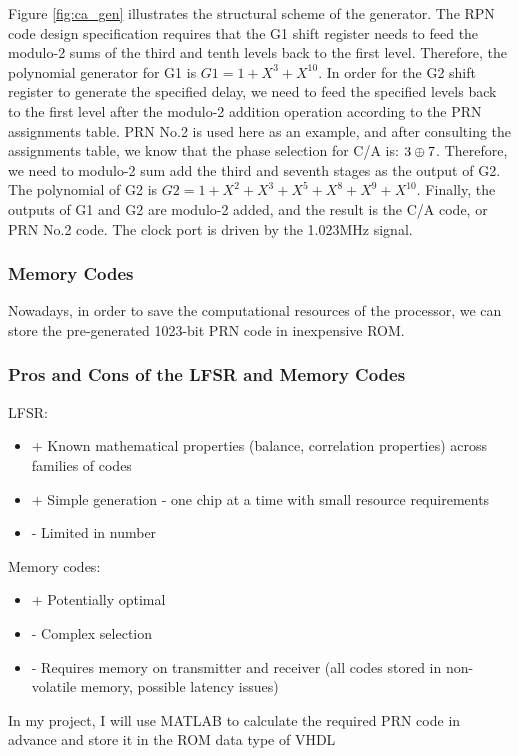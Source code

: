 Figure \ref{fig:ca_gen} illustrates the structural scheme of the generator. The RPN code design specification requires that the G1 shift register needs to feed the modulo-2 sums of the third and tenth levels back to the first level. Therefore, the polynomial generator for G1 is $G1=1+X^3+X^{10}$. In order for the G2 shift register to generate the specified delay, we need to feed the specified levels back to the first level after the modulo-2 addition operation according to the PRN assignments table. PRN No.2 is used here as an example, and after consulting the assignments table\cite{RN170}, we know that the phase selection for C/A is: $3\oplus 7$. Therefore, we need to modulo-2 sum add the third and seventh stages as the output of G2. The polynomial of G2 is $G2=1+X^2+X^3+X^5+X^8+X^9+X^{10}$. Finally, the outputs of G1 and G2 are modulo-2 added, and the result is the C/A code, or PRN No.2 code. The clock port is driven by the 1.023MHz signal.

\subsubsection{Memory Codes}
Nowadays, in order to save the computational resources of the processor, we can store the pre-generated 1023-bit PRN code in inexpensive ROM.

\subsubsection{Pros and Cons of the LFSR and Memory Codes}
LFSR:
\begin{itemize}
    \item + Known mathematical properties (balance, correlation properties) across families of codes
    \item + Simple generation - one chip at a time with small resource requirements
    \item - Limited in number
\end{itemize}
Memory codes:
\begin{itemize}
    \item + Potentially optimal
    \item - Complex selection
    \item - Requires memory on transmitter and receiver (all codes stored in non-volatile memory, possible latency issues)
\end{itemize}
In my project, I will use MATLAB to calculate the required PRN code in advance and store it in the ROM data type of VHDL

